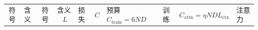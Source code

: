 \documentclass[12pt]{ctexart}
\newcommand{\Dt}{D}
\newcommand{\Lctx}{L_{\mathrm{ctx}}}
\newcommand{\Ctrain}{C_{\mathrm{train}}}
\newcommand{\Cattn}{C_{\mathrm{attn}}}
\begin{document}
\begin{table}[h]\centering\small
\begin{tabular}{clcl}
\toprule
符号 & 含义 & 符号 & 含义 \
\midrule
$L$ & 损失 & $C$ & 预算 \
$\Ctrain=6N\Dt$ & 训练 & $\Cattn=\eta N\Dt\Lctx$ & 注意力 \
\bottomrule
\end{tabular}
\end{table}
\end{document}

